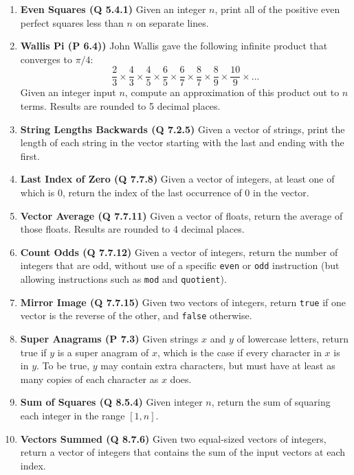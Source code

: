 \documentclass{sig-alternate}
\begin{document}
\begin{enumerate}
\item
\textbf{Even Squares (Q 5.4.1)}
Given an integer $n$, print all of the positive even perfect squares less than $n$ on separate lines.

\item
\textbf{Wallis Pi (P 6.4))}
John Wallis gave the following infinite product that converges to $\pi/4$:
\[
\frac{2}{3}\times \frac{4}{3}\times \frac{4}{5}\times \frac{6}{5}\times \frac{6}{7}\times \frac{8}{7}\times \frac{8}{9}\times \frac{10}{9} \times ...
\]
Given an integer input $n$, compute an approximation of this product out to $n$ terms. Results are rounded to 5 decimal places.

\item
\textbf{String Lengths Backwards (Q 7.2.5)}
Given a vector of strings, print the length of each string in the vector starting with the last and ending with the first.

\item
\textbf{Last Index of Zero (Q 7.7.8)}
Given a vector of integers, at least one of which is 0, return the index of the last occurrence of 0 in the vector.

\item
\textbf{Vector Average (Q 7.7.11)}
Given a vector of floats, return the average of those floats. Results are rounded to 4 decimal places.

\item
\textbf{Count Odds (Q 7.7.12)}
Given a vector of integers, return the number of integers that are odd, without use of a specific \texttt{even} or \texttt{odd} instruction (but allowing instructions such as \texttt{mod} and \texttt{quotient}).

\item
\textbf{Mirror Image (Q 7.7.15)}
Given two vectors of integers, return \texttt{true} if one vector is the reverse of the other, and \texttt{false} otherwise.

\item
\textbf{Super Anagrams (P 7.3)}
Given strings $x$ and $y$ of lowercase letters, return true if $y$ is a super anagram of $x$, which is the case if every character in $x$ is in $y$. To be true, $y$ may contain extra characters, but must have at least as many copies of each character as $x$ does.

\item
\textbf{Sum of Squares (Q 8.5.4)}
Given integer $n$, return the sum of squaring each integer in the range $[1, n]$.

\item
\textbf{Vectors Summed (Q 8.7.6)}
Given two equal-sized vectors of integers, return a vector of integers that contains the sum of the input vectors at each index.


\end{enumerate}
\end{document}

